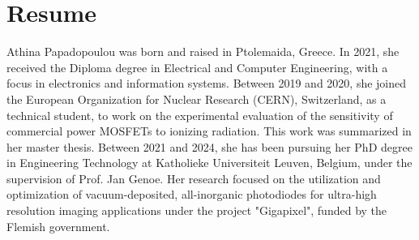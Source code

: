 \chapter{Resume}\label{ch:curriculum}

Athina Papadopoulou was born and raised in Ptolemaida, Greece. In 2021, she received the Diploma degree in Electrical and Computer Engineering, with a focus in electronics and information systems. Between 2019 and 2020, she joined the European Organization for Nuclear Research (CERN), Switzerland, as a technical student, to work on the experimental evaluation of the sensitivity of commercial power MOSFETs to ionizing radiation. This work was summarized in her master thesis. Between 2021 and 2024, she has been pursuing her PhD degree in Engineering Technology at Katholieke Universiteit Leuven, Belgium, under the supervision of Prof. Jan Genoe. Her research focused on the utilization and optimization of vacuum-deposited, all-inorganic photodiodes for ultra-high resolution imaging applications under the project "Gigapixel", funded by the Flemish government. 


\cleardoublepage

